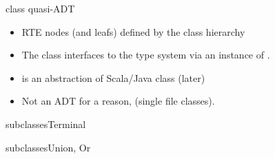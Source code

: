 \begin{frame}{ class quasi-ADT}
  \scalebox{0.8}{}

  \medskip

  \begin{itemize}
  \item RTE nodes (and leafs) defined by the class hierarchy 
  \item The  class interfaces to the type system via an instance of .
  \item {} is an abstraction of Scala/Java class (later)
  \item Not an ADT for a  reason, (single file   classes).
  \end{itemize}
\end{frame}

\newsavebox\leafbox
\begin{lrbox}{\leafbox}
  \begin{minipage}{12cm}
    
  \end{minipage}
\end{lrbox}

\begin{frame}{ subclasses}{Terminal}
  \usebox\leafbox
\end{frame}

\newsavebox\orbox
\begin{lrbox}{\orbox}
  \begin{minipage}{12cm}
    
  \end{minipage}
\end{lrbox}

\newsavebox\andbox
\begin{lrbox}{\andbox}
  \begin{minipage}{12cm}
    
  \end{minipage}
\end{lrbox}


\begin{frame}{ subclasses}{Union, Or}
  \usebox\orbox
 \end{frame}




\newsavebox\catbox
\begin{lrbox}{\catbox}
  \begin{minipage}{12cm}
    
  \end{minipage}
\end{lrbox}


